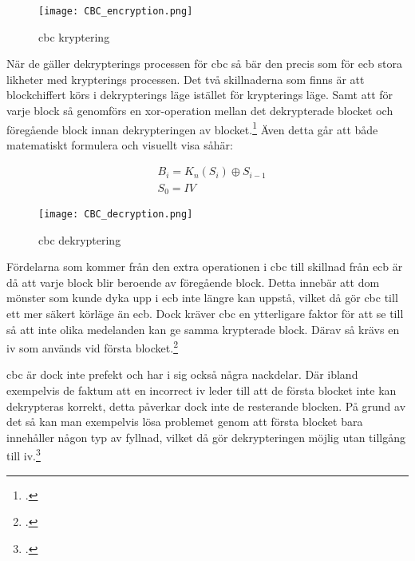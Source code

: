\begin{figure}[H]
    \texttt{[image: CBC\_encryption.png]}
    \caption{\acrlong{cbc} kryptering \cite{cbc-mode-enc-ref}}
    \label{fig:cbc-mode-enc}
\end{figure}

När de gäller dekrypterings processen för \acrshort{cbc} så bär den precis som för
\acrshort{ecb} stora likheter med krypterings processen. Det två skillnaderna som
finns är att blockchiffert körs i dekrypterings läge istället för krypterings läge.
Samt att för varje block så genomförs en \gls{xor}-operation mellan det dekrypterade
blocket och föregående block innan dekrypteringen av blocket.\footcite{modesofoperation}
Även detta går att både matematiskt formulera och visuellt visa såhär:

\begin{equation}
    \label{eq:cbc-decryption}
    \begin{aligned}
        &B_i = K_n(S_i) \oplus S_{i-1}\\\nonumber
        &S_0 = IV
    \end{aligned}
\end{equation}

\begin{figure}[H]
    \texttt{[image: CBC\_decryption.png]}
    \caption{\acrlong{cbc} dekryptering \cite{cbc-mode-dec-ref}}
    \label{fig:cbc-mode-dec}
\end{figure}

Fördelarna som kommer från den extra operationen i \acrshort{cbc} till skillnad
från \acrshort{ecb} är då att varje block blir beroende av föregående block.
Detta innebär att dom mönster som kunde dyka upp i \acrshort{ecb} inte längre
kan uppstå, vilket då gör \acrshort{cbc} till ett mer säkert körläge än \acrshort{ecb}.
Dock kräver \acrshort{cbc} en ytterligare faktor för att se till så att inte olika medelanden
kan ge samma krypterade block. Därav så krävs en \acrfull{iv} som används vid första
blocket.\footcite{modesofoperation}

\acrshort{cbc} är dock inte prefekt och har i sig också några nackdelar. Där ibland
exempelvis de faktum att en incorrect \acrshort{iv} leder till att de första blocket
inte kan dekrypteras korrekt, detta påverkar dock inte de resterande blocken. På grund
av det så kan man exempelvis lösa problemet genom att första blocket bara innehåller
någon typ av fyllnad, vilket då gör dekrypteringen möjlig utan tillgång till \acrshort{iv}.\footcite{modesofoperation}

